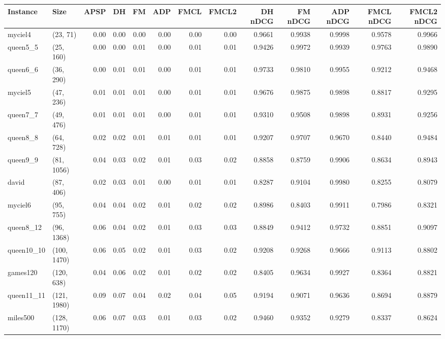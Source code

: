 \begin{tabular}{llrrrrrrrrrrr}
\toprule
  Instance &         Size &  APSP &   DH &   FM &  ADP &  FMCL &  FMCL2 &  DH nDCG &  FM nDCG &  ADP nDCG &  FMCL nDCG &  FMCL2 nDCG \\
\midrule
   myciel4 &     (23, 71) &  0.00 & 0.00 & 0.00 & 0.00 &  0.00 &   0.00 &   0.9661 &   0.9938 &    0.9998 &     0.9578 &      0.9966 \\
  queen5\_5 &    (25, 160) &  0.00 & 0.00 & 0.01 & 0.00 &  0.01 &   0.01 &   0.9426 &   0.9972 &    0.9939 &     0.9763 &      0.9890 \\
  queen6\_6 &    (36, 290) &  0.00 & 0.01 & 0.01 & 0.00 &  0.01 &   0.01 &   0.9733 &   0.9810 &    0.9955 &     0.9212 &      0.9468 \\
   myciel5 &    (47, 236) &  0.01 & 0.01 & 0.01 & 0.00 &  0.01 &   0.01 &   0.9676 &   0.9875 &    0.9898 &     0.8817 &      0.9295 \\
  queen7\_7 &    (49, 476) &  0.01 & 0.01 & 0.01 & 0.00 &  0.01 &   0.01 &   0.9310 &   0.9508 &    0.9898 &     0.8931 &      0.9256 \\
  queen8\_8 &    (64, 728) &  0.02 & 0.02 & 0.01 & 0.01 &  0.01 &   0.01 &   0.9207 &   0.9707 &    0.9670 &     0.8440 &      0.9484 \\
  queen9\_9 &   (81, 1056) &  0.04 & 0.03 & 0.02 & 0.01 &  0.03 &   0.02 &   0.8858 &   0.8759 &    0.9906 &     0.8634 &      0.8943 \\
     david &    (87, 406) &  0.02 & 0.03 & 0.01 & 0.00 &  0.01 &   0.01 &   0.8287 &   0.9104 &    0.9980 &     0.8255 &      0.8079 \\
   myciel6 &    (95, 755) &  0.04 & 0.04 & 0.02 & 0.01 &  0.02 &   0.02 &   0.8986 &   0.8403 &    0.9911 &     0.7986 &      0.8321 \\
 queen8\_12 &   (96, 1368) &  0.06 & 0.04 & 0.02 & 0.01 &  0.03 &   0.03 &   0.8849 &   0.9412 &    0.9732 &     0.8851 &      0.9097 \\
queen10\_10 &  (100, 1470) &  0.06 & 0.05 & 0.02 & 0.01 &  0.03 &   0.02 &   0.9208 &   0.9268 &    0.9666 &     0.9113 &      0.8802 \\
  games120 &   (120, 638) &  0.04 & 0.06 & 0.02 & 0.01 &  0.02 &   0.02 &   0.8405 &   0.9634 &    0.9927 &     0.8364 &      0.8821 \\
queen11\_11 &  (121, 1980) &  0.09 & 0.07 & 0.04 & 0.02 &  0.04 &   0.05 &   0.9194 &   0.9071 &    0.9636 &     0.8694 &      0.8879 \\
  miles500 &  (128, 1170) &  0.06 & 0.07 & 0.03 & 0.01 &  0.03 &   0.02 &   0.9460 &   0.9352 &    0.9279 &     0.8337 &      0.8624 \\

\end{tabular}

